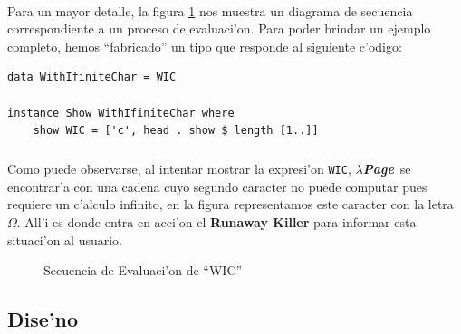 \documentclass[a4paper]{article}
\newcommand{\hpage}{\textbf{\textsl{$\lambda$Page}}}
\begin{document}
\paragraph{}Para un mayor detalle, la figura \ref{seq1} nos muestra un diagrama de secuencia correspondiente a un proceso de evaluaci'on.  Para poder brindar un ejemplo completo, hemos ``fabricado'' un tipo que responde al siguiente c'odigo:
\lstset{language=haskell, frame=single, tabsize=4}
\begin{center}\begin{lstlisting}
data WithIfiniteChar = WIC

instance Show WithIfiniteChar where
    show WIC = ['c', head . show $ length [1..]]
\end{lstlisting}\end{center}
\subparagraph{}Como puede observarse, al intentar mostrar la expresi'on \texttt{WIC}, \hpage\ se encontrar'a con una cadena cuyo segundo caracter no puede computar pues requiere un c'alculo infinito, en la figura representamos este caracter con la letra $\Omega$.  All'i es donde entra en acci'on el \textbf{Runaway Killer} para informar esta situaci'on al usuario.
\begin{figure}[hp]
	\begin{center}
		\caption{Secuencia de Evaluaci'on de ``WIC''}
		\label{seq1}
	\end{center}
\end{figure}

\subsection{Dise'no}
\begin{epigraphs}
\end{epigraphs}
\end{document}
